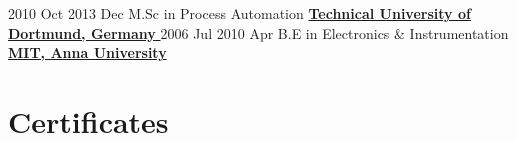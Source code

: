 \documentclass[letterpaper]{DS_class_file} %
\begin{document}
\begin{twenty} %

   	\twentyitem
	    {2010 Oct}
	    {2013 Dec}
	    {\hspace{0.2cm}M.Sc in Process Automation}
	    {\href{https://www.tu-dortmund.de/en/}{\hspace{0.27cm} \textbf{Technical University of Dortmund, Germany} }}
	    {}
	    {}
        \twentyitem
	    {2006 Jul}
	    {2010 Apr}
	    {\hspace{0.2cm}B.E in Electronics \& Instrumentation}
	    {\href{https://mitindia.edu/}{\hspace{0.27cm} \textbf{MIT, Anna University} }}
	    {}
	    {} 
\end{twenty}


\section{\faCertificate Certificates}
\end{document}
